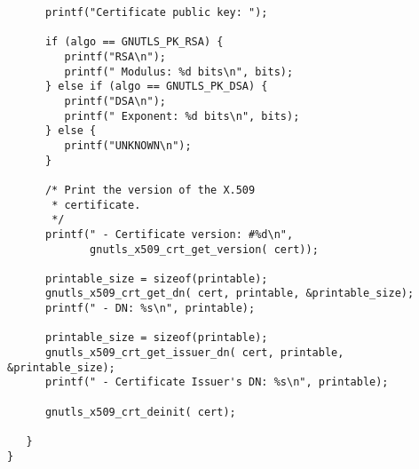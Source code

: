 \begin{verbatim}
      printf("Certificate public key: ");

      if (algo == GNUTLS_PK_RSA) {
         printf("RSA\n");
         printf(" Modulus: %d bits\n", bits);
      } else if (algo == GNUTLS_PK_DSA) {
         printf("DSA\n");
         printf(" Exponent: %d bits\n", bits);
      } else {
         printf("UNKNOWN\n");
      }

      /* Print the version of the X.509 
       * certificate.
       */
      printf(" - Certificate version: #%d\n",
             gnutls_x509_crt_get_version( cert));

      printable_size = sizeof(printable);
      gnutls_x509_crt_get_dn( cert, printable, &printable_size);
      printf(" - DN: %s\n", printable);

      printable_size = sizeof(printable);
      gnutls_x509_crt_get_issuer_dn( cert, printable, &printable_size);
      printf(" - Certificate Issuer's DN: %s\n", printable);

      gnutls_x509_crt_deinit( cert);

   }
}

\end{verbatim}
